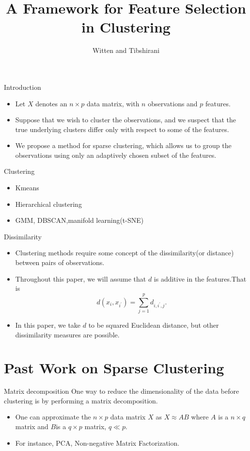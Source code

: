\documentclass[12pt]{beamer}
\author{Witten and Tibshirani}
\title{A Framework for Feature Selection in Clustering}
\begin{document}
\begin{frame}
\titlepage
\end{frame}


\begin{frame}{Introduction}
\begin{itemize}
\item Let $X$ denotes an $n\times p$ data matrix, with $n$ observations and $p$ features.
\item Suppose that we wish to cluster the observations, and
we suspect that the true underlying clusters differ only with respect
to some of the features.
\item We propose a method for sparse
clustering, which allows us to group the observations using only
an adaptively chosen subset of the features.
\end{itemize}
\end{frame}

\begin{frame}{Clustering}
\begin{itemize}
\item Kmeans
\item Hierarchical clustering
\item GMM, DBSCAN,manifold learning(t-SNE)
\end{itemize}
\end{frame}

\begin{frame}{Dissimilarity}
\begin{itemize}
\item  Clustering methods require some concept of the dissimilarity(or distance) between pairs of observations.
\item Throughout this paper,
we will assume that $d$ is additive in the features.That is
$$
d(x_i,x_{i^{'}})=\sum_{j=1}^p d_{i,i^{'},j}.
$$
\item In this paper, we take $d$ to be squared Euclidean distance, but other dissimilarity measures are possible.
\end{itemize}
\end{frame}

\section{Past Work on Sparse Clustering}
\begin{frame}{Matrix decomposition}
One way to reduce the dimensionality of the data before clustering
is by performing a matrix decomposition.
\begin{itemize}
\item One can approximate the $n \times p$ data matrix $X$ as $X\approx AB$ where $A$ is a $n \times q$ matrix and $B$is a $q\times p$ matrix, $q\ll p$.
\item For instance, PCA, Non-negative Matrix Factorization. 
\end{itemize}
\end{frame}
\end{document}
